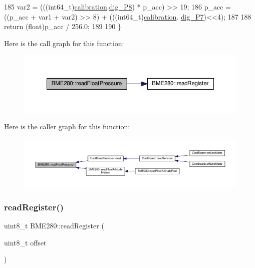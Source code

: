 \begin{DoxyCode}
185     var2 = (((int64\_t)\hyperlink{class_b_m_e280_aa7a28484b6f5eb6f43261ea25016fbf8}{calibration}.\hyperlink{struct_sensor_calibration_a06372d2918206f0cd35954e5bb35a1d2}{dig\_P8}) * p\_acc) >> 19;
186     p\_acc = ((p\_acc + var1 + var2) >> 8) + (((int64\_t)\hyperlink{class_b_m_e280_aa7a28484b6f5eb6f43261ea25016fbf8}{calibration}.
      \hyperlink{struct_sensor_calibration_adda4a99343f9e02de7d9f2d5949477d2}{dig\_P7})<<4);
187     
188     \textcolor{keywordflow}{return} (\textcolor{keywordtype}{float})p\_acc / 256.0;
189     
190 \}
\end{DoxyCode}
Here is the call graph for this function\+:\nopagebreak
\begin{figure}[H]
\begin{center}
\leavevmode
\includegraphics[width=350pt]{df/dcf/class_b_m_e280_ada6e799917afb4f228e6253bc56ffe75_cgraph}
\end{center}
\end{figure}
Here is the caller graph for this function\+:\nopagebreak
\begin{figure}[H]
\begin{center}
\leavevmode
\includegraphics[width=350pt]{df/dcf/class_b_m_e280_ada6e799917afb4f228e6253bc56ffe75_icgraph}
\end{center}
\end{figure}
\mbox{\label{class_b_m_e280_a1bbd14c8591966df531e40085342ff71}} 
\subsubsection{\texorpdfstring{read\+Register()}{readRegister()}}
{\footnotesize\ttfamily uint8\+\_\+t B\+M\+E280\+::read\+Register (\begin{DoxyParamCaption}\item[{uint8\+\_\+t}]{offset }\end{DoxyParamCaption})}



